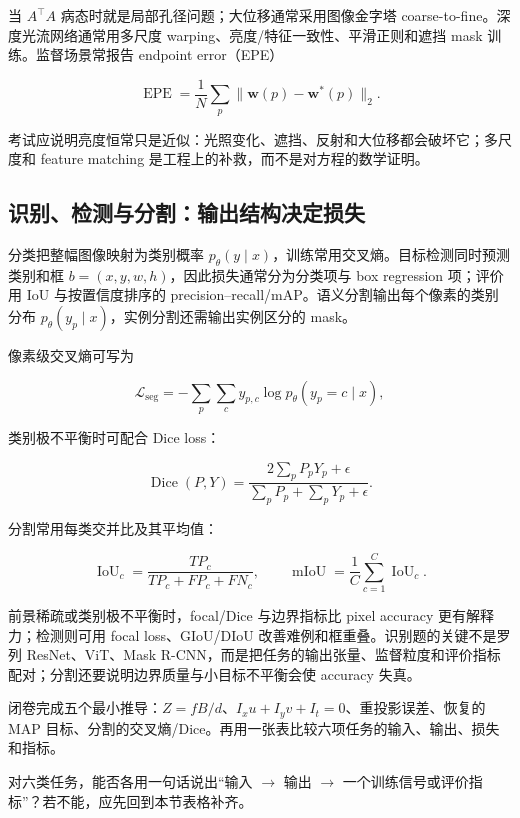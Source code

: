 \documentclass[11pt]{ctexart}
\begin{document}
当 \(A^\top A\) 病态时就是局部孔径问题；大位移通常采用图像金字塔 coarse-to-fine。深度光流网络通常用多尺度 warping、亮度/特征一致性、平滑正则和遮挡 mask 训练。监督场景常报告 endpoint error（EPE）

\[
  \operatorname{EPE}=\frac1N\sum_{p}\|\mathbf w(p)-\mathbf w^*(p)\|_2.
\]

考试应说明亮度恒常只是近似：光照变化、遮挡、反射和大位移都会破坏它；多尺度和 feature matching 是工程上的补救，而不是对方程的数学证明。

\subsection{识别、检测与分割：输出结构决定损失}

分类把整幅图像映射为类别概率 \(p_\theta(y\mid x)\)，训练常用交叉熵。目标检测同时预测类别和框 \(b=(x,y,w,h)\)，因此损失通常分为分类项与 box regression 项；评价用 IoU 与按置信度排序的 precision--recall/mAP。语义分割输出每个像素的类别分布 \(p_{\theta}(y_p\mid x)\)，实例分割还需输出实例区分的 mask。

像素级交叉熵可写为

\[
  \mathcal{L}_{\mathrm{seg}}
  =
  -\sum_{p}\sum_{c}y_{p,c}\log p_{\theta}(y_p=c\mid x),
\]

类别极不平衡时可配合 Dice loss：

\[
  \operatorname{Dice}(P,Y)
  =
  \frac{2\sum_pP_pY_p+\epsilon}{\sum_pP_p+\sum_pY_p+\epsilon}.
\]

分割常用每类交并比及其平均值：

\[
  \operatorname{IoU}_c
  =\frac{TP_c}{TP_c+FP_c+FN_c},
  \qquad
  \operatorname{mIoU}=\frac1C\sum_{c=1}^{C}\operatorname{IoU}_c.
\]

前景稀疏或类别极不平衡时，focal/Dice 与边界指标比 pixel accuracy 更有解释力；检测则可用 focal loss、GIoU/DIoU 改善难例和框重叠。识别题的关键不是罗列 ResNet、ViT、Mask R-CNN，而是把任务的输出张量、监督粒度和评价指标配对；分割还要说明边界质量与小目标不平衡会使 accuracy 失真。

\begin{checkpoint}[视觉单元闭卷验收]
闭卷完成五个最小推导：\(Z=fB/d\)、\(I_xu+I_yv+I_t=0\)、重投影误差、恢复的 MAP 目标、分割的交叉熵/Dice。再用一张表比较六项任务的输入、输出、损失和指标。
\end{checkpoint}

\begin{checkpoint}[视觉任务自检]
对六类任务，能否各用一句话说出“输入 \(\to\) 输出 \(\to\) 一个训练信号或评价指标”？若不能，应先回到本节表格补齐。
\end{checkpoint}
\end{document}
